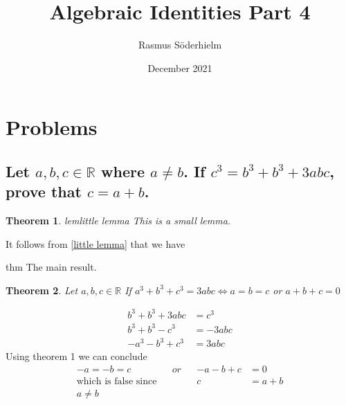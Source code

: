 \documentclass{article}
\title{Algebraic Identities Part 4}
\author{Rasmus Söderhielm}
\date{December 2021}
\newtheorem{theorem}{Theorem}
\begin{document}
\linespread{1.5}\selectfont

\maketitle

\section{Problems}




\subsection{
	\normalfont
	Let $a, b, c \in \mathbb{R} $ where $a \neq b$. If $c^3 = b^3 + b^3 + 3abc$, prove that $c=a+b$.
}

\begin{theorem}{lem}{little lemma} This is a small lemma. \end{theorem}
It follows from \ref{little lemma} that we have
\begin{theorem*}{thm} The main result. \end{theorem*}

\begin{theorem}
	Let $ a, b, c \in \mathbb{R} $ If $ a^3 + b^3 + c^3 = 3abc \Leftrightarrow a = b = c $ or $ a + b + c = 0 $
\end{theorem}

\begin{align*}
	b^3 + b^3 + 3abc & = c^3   \\
	b^3 + b^3 - c^3  & = -3abc \\
	-a^3 - b^3 + c^3 & = 3abc
\end{align*}
Using theorem 1 we can conclude
\begin{align*}
	-a = -b = c                 &  & or &  & -a - b + c & = 0     \\
	\text{which is false since} &  &    &  & c          & = a + b \\
	a \neq b
\end{align*}
\end{document}
